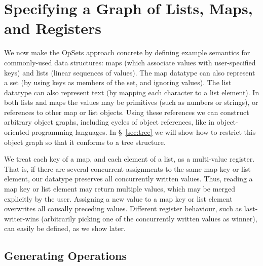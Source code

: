 \section{Specifying a Graph of Lists, Maps, and Registers}\label{sec:datatypes}

We now make the OpSets approach concrete by defining example semantics for commonly-used data structures: maps (which associate values with user-specified keys) and lists (linear sequences of values).
The map datatype can also represent a set (by using keys as members of the set, and ignoring values).
The list datatype can also represent text (by mapping each character to a list element).
In both lists and maps the values may be primitives (such as numbers or strings), or references to other map or list objects.
Using these references we can construct arbitrary object graphs, including cycles of object references, like in object-oriented programming languages.
In \S~\ref{sec:tree} we will show how to restrict this object graph so that it conforms to a tree structure.

We treat each key of a map, and each element of a list, as a multi-value register.
That is, if there are several concurrent assignments to the same map key or list element, our datatype preserves all concurrently written values.
Thus, reading a map key or list element may return multiple values, which may be merged explicitly by the user.
Assigning a new value to a map key or list element overwrites all causally preceding values.
Different register behaviour, such as last-writer-wins (arbitrarily picking one of the concurrently written values as winner), can easily be defined, as we show later.

\subsection{Generating Operations}\label{sec:datatypes-gen}

